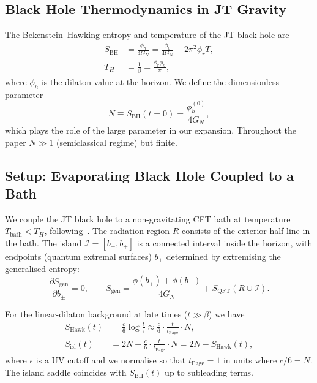 \documentclass[12pt,a4paper]{article}
\newcommand{\SBH}{S_{\mathrm{BH}}}
\newcommand{\SHawk}{S_{\mathrm{Hawk}}}
\newcommand{\Sisl}{S_{\mathrm{isl}}}
\newcommand{\tPage}{t_{\mathrm{Page}}}
\newcommand{\II}{\mathcal{I}}
\newcommand{\Phi}{\phi}  %
\begin{document}
\subsection{Black Hole Thermodynamics in JT Gravity}
\label{subsec:BH_thermo}

The Bekenstein--Hawking entropy and temperature of the JT black hole are
\begin{align}
  \SBH &= \frac{\Phi_h}{4G_N} = \frac{\Phi_0}{4G_N} + 2\pi^2\phi_r T,
\label{eq:BH_entropy}\\
  T_H &= \frac{1}{\beta} = \frac{\phi_r \Phi_h}{\pi},
\label{eq:Hawking_temp}
\end{align}
where $\Phi_h$ is the dilaton value at the horizon.  We define the
dimensionless parameter
\begin{equation}
  N \equiv \SBH(t=0) = \frac{\Phi_h^{(0)}}{4G_N},
\label{eq:N_def}
\end{equation}
which plays the role of the large parameter in our expansion.
Throughout the paper $N \gg 1$ (semiclassical regime) but finite.

\subsection{Setup: Evaporating Black Hole Coupled to a Bath}
\label{subsec:setup}

We couple the JT black hole to a non-gravitating CFT bath at temperature
$T_{\mathrm{bath}} < T_H$, following~\cite{Almheiri2019b}.  The radiation
region $R$ consists of the exterior half-line in the bath.
The island $\II = [b_-, b_+]$ is a connected interval inside the horizon,
with endpoints (quantum extremal surfaces) $b_\pm$ determined by
extremising the generalised entropy:
\begin{equation}
  \frac{\partial S_{\mathrm{gen}}}{\partial b_\pm} = 0,
  \qquad
  S_{\mathrm{gen}} = \frac{\Phi(b_+)+\Phi(b_-)}{4G_N}
    + S_{\mathrm{QFT}}(R\cup\II).
\label{eq:extremisation}
\end{equation}

For the linear-dilaton background at late times ($t \gg \beta$) we have
\begin{align}
  \SHawk(t) &= \frac{c}{6}\log\frac{t}{\epsilon}
    \approx \frac{c}{6}\cdot\frac{t}{\tPage}\cdot N,
\label{eq:S_Hawking_late}\\
  \Sisl(t) &= 2N - \frac{c}{6}\cdot\frac{t}{\tPage}\cdot N
    = 2N - \SHawk(t),
\label{eq:S_island_late}
\end{align}
where $\epsilon$ is a UV cutoff and we normalise so that $\tPage = 1$ in
units where $c/6 = N$.  The island saddle coincides with $\SBH(t)$ up to
subleading terms.
\end{document}

